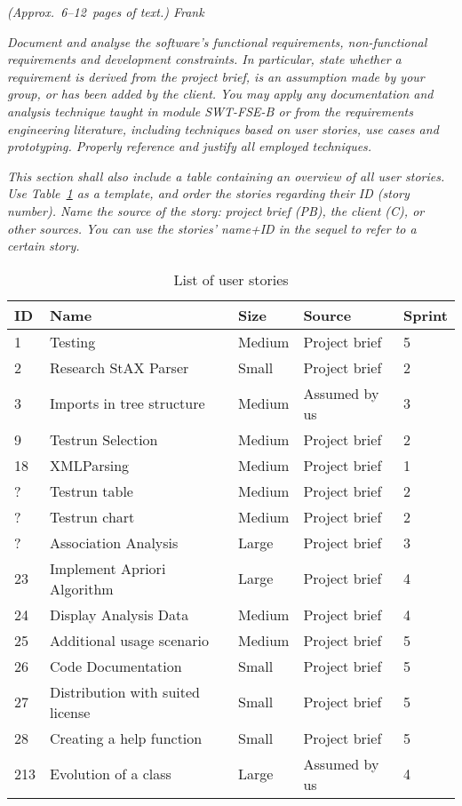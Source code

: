 \emph{(Approx.~6--12~pages of text.) Frank}

\emph{Document and analyse the software's functional requirements, 
non-functional requirements and development constraints. In particular, state 
whether a requirement is derived from the project brief, is an assumption made 
by your group, or has been added by the client. You may apply any documentation 
and analysis technique taught in module SWT-FSE-B or from the 
requirements engineering literature, including techniques based on user stories, 
use cases and prototyping. Properly reference and justify all employed 
techniques.}

\emph{This section shall also include a table containing an overview of all user 
stories. Use Table~\ref{tab:user_stories} as a template, and order the stories 
regarding their ID (story number). Name the source of the story: project brief 
(PB), the client (C), or other sources. You can use the stories' name+ID in the 
sequel to refer to a certain story.}

\begin{table}[!h]
  \caption{List of user stories}
  \centering
  \begin{tabular}{l||l|l|l|l|}
    ID & Name & Size &  Source & Sprint\\
    \hline
    1&Testing&Medium&Project brief&5\\
    2&Research StAX Parser&Small&Project brief&2\\
    3&Imports in tree structure&Medium&Assumed by us&3\\ %
    9&Testrun Selection&Medium&Project brief&2\\
    18&XMLParsing&Medium&Project brief&1\\
    ?&Testrun table&Medium&Project brief&2\\
    ?&Testrun chart&Medium&Project brief&2\\
    ?&Association Analysis&Large&Project brief&3\\
    23&Implement Apriori Algorithm&Large&Project brief&4\\
    24&Display Analysis Data&Medium&Project brief&4\\
    25&Additional usage scenario&Medium&Project brief&5\\
    26&Code Documentation&Small&Project brief&5\\
    27&Distribution with suited license&Small&Project brief&5\\ %
    28&Creating a help function&Small&Project brief&5\\
    213&Evolution of a class&Large&Assumed by us&4\\
    
    
    
    
  \end{tabular}
  \label{tab:user_stories}
\end{table}

